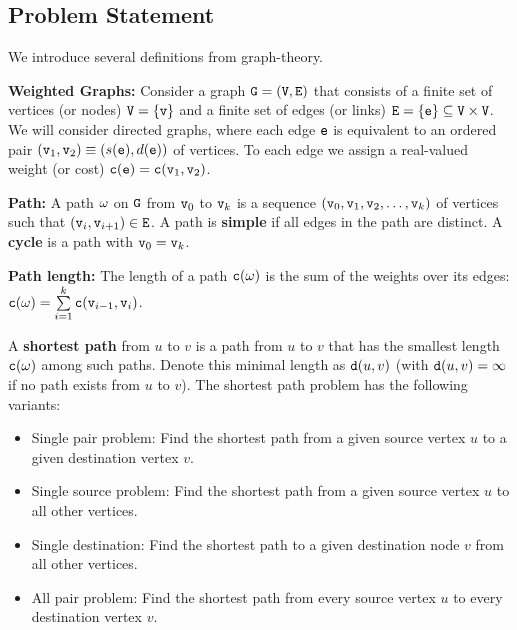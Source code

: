 \subsection{Problem Statement}
We introduce several definitions from graph-theory.
\begin{definition}\textbf{Weighted Graphs:} Consider a graph ${\tt G} = ({\tt V},{\tt E})$ that consists of a finite set of vertices (or nodes) ${\tt V} = \{ {\tt v}\} $ and a finite set of edges (or links) ${\tt E} = \{ {\tt e}\} \subseteq {\tt V}\times{\tt V}$. We will consider directed graphs, where each edge ${\tt e}$ is equivalent to an ordered pair $({{\tt v}_1},{{\tt v}_2}) \equiv (s({\tt e}),d({\tt e}))$ of vertices. To each edge we assign a real-valued weight (or cost) ${\tt c}({\tt e}) = {\tt c}({{\tt v}_1},{{\tt v}_2})$.
\end{definition}
\begin{definition}\textbf{Path:}
A path ${\tt \omega}$ on ${\tt G}$ from ${{\tt v}_0}$ to ${{\tt v}_k}$ is a sequence $({{\tt v}_0},{{\tt v}_1},{{\tt v}_2}, \ldots ,{{\tt v}_k})$ of vertices such that $({{\tt v}_i},{{\tt v}_{i + 1}}) \in {\tt E}$. A path is \textbf{simple} if all edges in the path are distinct.
A \textbf{cycle}  is a path with ${{\tt v}_0} = {{\tt v}_k}$.
\end{definition}
\begin{definition}\textbf{Path length:}
The length of a path ${\tt c}({\tt \omega})$ is the sum of the weights over its edges:
${\tt c}({\tt \omega}) = \sum\limits_{i = 1}^k {{\tt c}({{\tt v}_{i - 1}},{{\tt v}_i})} $.
\end{definition}

A \textbf{shortest path} from $u$ to $v$ is a path from $u$ to $v$ that has the smallest length  ${\tt c}({\tt \omega})$ among such paths. Denote this minimal length as ${\tt d}(u,v)$ (with ${\tt d}(u,v) = \infty $ if no path exists from $u$ to $v$).
The shortest path problem has the following variants:
\begin{itemize}
  \item Single pair problem:  Find the shortest path from a given source vertex $u$ to a given destination vertex $v$.
  \item Single source problem: Find the shortest path from a given source vertex $u$ to all other vertices.
  \item Single destination: Find the shortest path to a given destination node $v$ from all other vertices.
  \item All pair problem: Find the shortest path from every source vertex $u$ to every destination vertex $v$.
\end{itemize}

